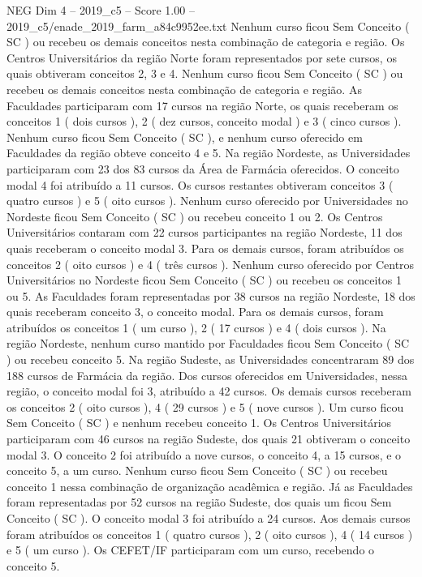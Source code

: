 \begin{textsample}{NEG Dim 4 – 2019\_c5 – Score 1.00 – 2019\_c5/enade\_2019\_farm\_a84c9952ee.txt}
Nenhum curso ficou Sem Conceito ( SC ) ou recebeu os demais conceitos nesta combinação de categoria e região.
Os Centros Universitários da região Norte foram representados por sete cursos, os quais obtiveram conceitos 2, 3 e 4.
Nenhum curso ficou Sem Conceito ( SC ) ou recebeu os demais conceitos nesta combinação de categoria e região.
As Faculdades participaram com 17 cursos na região Norte, os quais receberam os conceitos 1 ( dois cursos ), 2 ( dez cursos, conceito modal ) e 3 ( cinco cursos ).
Nenhum curso ficou Sem Conceito ( SC ), e nenhum curso oferecido em Faculdades da região obteve conceito 4 e 5.
Na região Nordeste, as Universidades participaram com 23 dos 83 cursos da Área de Farmácia oferecidos.
O conceito modal 4 foi atribuído a 11 cursos.
Os cursos restantes obtiveram conceitos 3 ( quatro cursos ) e 5 ( oito cursos ).
Nenhum curso oferecido por Universidades no Nordeste ficou Sem Conceito ( SC ) ou recebeu conceito 1 ou 2.
Os Centros Universitários contaram com 22 cursos participantes na região Nordeste, 11 dos quais receberam o conceito modal 3.
Para os demais cursos, foram atribuídos os conceitos 2 ( oito cursos ) e 4 ( três cursos ).
Nenhum curso oferecido por Centros Universitários no Nordeste ficou Sem Conceito ( SC ) ou recebeu os conceitos 1 ou 5.
As Faculdades foram representadas por 38 cursos na região Nordeste, 18 dos quais receberam conceito 3, o conceito modal.
Para os demais cursos, foram atribuídos os conceitos 1 ( um curso ), 2 ( 17 cursos ) e 4 ( dois cursos ).
Na região Nordeste, nenhum curso mantido por Faculdades ficou Sem Conceito ( SC ) ou recebeu conceito 5.
Na região Sudeste, as Universidades concentraram 89 dos 188 cursos de Farmácia da região.
Dos cursos oferecidos em Universidades, nessa região, o conceito modal foi 3, atribuído a 42 cursos.
Os demais cursos receberam os conceitos 2 ( oito cursos ), 4 ( 29 cursos ) e 5 ( nove cursos ).
Um curso ficou Sem Conceito ( SC ) e nenhum recebeu conceito 1.
Os Centros Universitários participaram com 46 cursos na região Sudeste, dos quais 21 obtiveram o conceito modal 3.
O conceito 2 foi atribuído a nove cursos, o conceito 4, a 15 cursos, e o conceito 5, a um curso.
Nenhum curso ficou Sem Conceito ( SC ) ou recebeu conceito 1 nessa combinação de organização acadêmica e região.
Já as Faculdades foram representadas por 52 cursos na região Sudeste, dos quais um ficou Sem Conceito ( SC ).
O conceito modal 3 foi atribuído a 24 cursos.
Aos demais cursos foram atribuídos os conceitos 1 ( quatro cursos ), 2 ( oito cursos ), 4 ( 14 cursos ) e 5 ( um curso ).
Os CEFET/IF participaram com um curso, recebendo o conceito 5.

\end{textsample}

